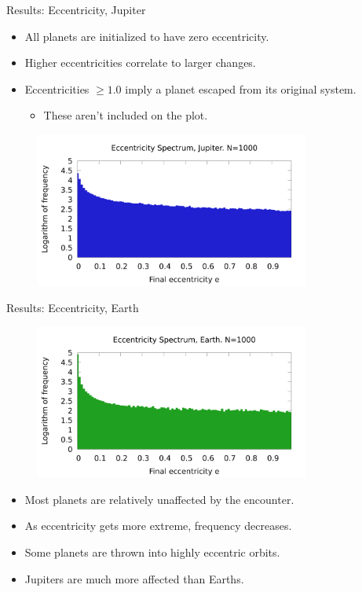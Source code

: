 \documentclass{beamer}
\begin{document}
\begin{frame}{Results: Eccentricity, Jupiter}
    \begin{itemize}
        \item All planets are initialized to have zero eccentricity.
        \item Higher eccentricities correlate to larger changes.
        \item Eccentricities $\ge 1.0$ imply a planet escaped from its
            original system.
            \begin{itemize}
                \item These aren't included on the plot.
            \end{itemize}
    \end{itemize}
    \begin{figure}
        \centering
        \includegraphics[height=2.0in]{slides/ecc_jupiter_n1000}
    \end{figure}
\end{frame}

\begin{frame}{Results: Eccentricity, Earth}
    \begin{figure}
        \centering
        \includegraphics[height=2.0in]{slides/ecc_earth_n1000}
    \end{figure}
    \begin{itemize}
        \item Most planets are relatively unaffected by the encounter.
        \item As eccentricity gets more extreme, frequency decreases.
        \item Some planets are thrown into highly eccentric orbits.
        \item Jupiters are much more affected than Earths.
    \end{itemize}
\end{frame}
\end{document}
